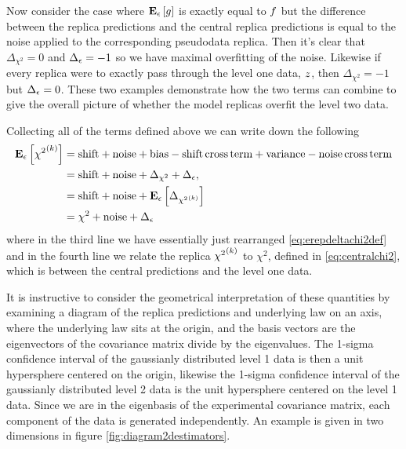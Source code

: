 Now consider the case where $\mathbf{E}_{\epsilon}\left[ g \right]$ is exactly
equal to $f$ but the difference between the replica predictions and the
central replica predictions is equal to the noise applied to the corresponding
pseudodata replica. Then it's clear that $\Delta_{\chi^2}=0$ and $\Delta_{\epsilon}=-1$
so we have maximal overfitting of the noise. Likewise if every replica were to
exactly pass through the level one data, $z$, then $\Delta_{\chi^2}=-1$
but $\Delta_{\epsilon}=0$. These two examples demonstrate how the two terms can combine
to give the overall picture of whether the model replicas overfit the level two
data.

Collecting all of the terms defined above we can write down the following
\begin{equation}
    \label{eq:chi2decomp}
    \begin{split}
        \mathbf{E}_{\epsilon}\left[ {\chi^2}^{(k)} \right] &= {\rm shift} + {\rm noise} + {\rm bias} - {\rm shift \, cross \, term} + {\rm variance} - {\rm noise \, cross \, term} \\
        &=  {\rm shift} + {\rm noise} + \Delta_{\chi^2} + \Delta_{\epsilon},\\
        &= {\rm shift} + {\rm noise} + \mathbf{E}_{\epsilon}\left[ \Delta_{{\chi^2}^{(k)}} \right] \\
        &= \chi^2 + {\rm noise} + \Delta_{\epsilon}
    \end{split}
\end{equation}
where in the third line we have essentially just rearranged
\eqref{eq:erepdeltachi2def} and in the fourth line we relate the replica
${\chi^2}^{(k)}$ to $\chi^2$, defined in \eqref{eq:centralchi2}, which is between the
central predictions and the level one data.

It is instructive to
consider the geometrical interpretation of these quantities by examining a
diagram of the replica predictions and underlying law on an axis, where
the underlying law sits at the origin, and the basis vectors are the eigenvectors
of the covariance matrix divide by the eigenvalues. The 1-sigma confidence interval
of the gaussianly distributed level 1 data is then a unit hypersphere centered
on the origin, likewise the 1-sigma confidence interval of the gaussianly
distributed level 2 data is the unit hypersphere centered on the level 1 data.
Since we are in the eigenbasis of the experimental covariance matrix, each
component of the data is generated independently. An example is given in
two dimensions in figure \ref{fig:diagram2destimators}.

